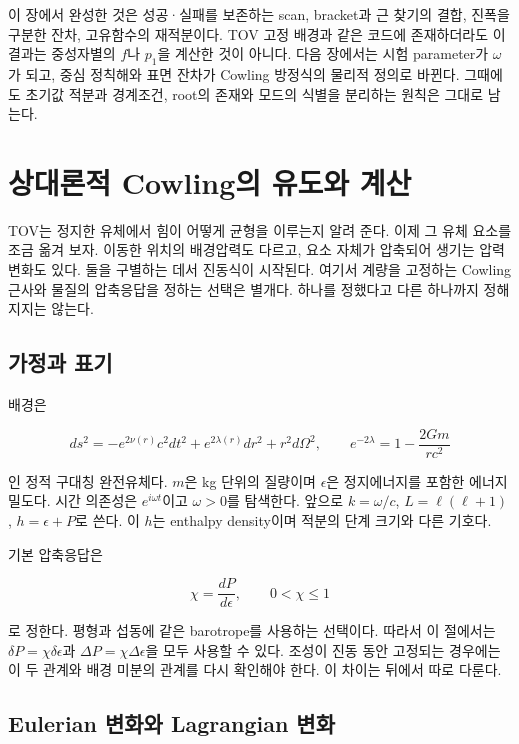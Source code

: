 \documentclass[
  10pt,
  a4paper,
]{article}
\begin{document}
이 장에서 완성한 것은 성공·실패를 보존하는 scan, bracket과 근 찾기의
결합, 진폭을 구분한 잔차, 고유함수의 재적분이다. TOV 고정 배경과 같은
코드에 존재하더라도 이 결과는 중성자별의 \(f\)나 \(p_1\)을 계산한 것이
아니다. 다음 장에서는 시험 parameter가 \(\omega\)가 되고, 중심 정칙해와
표면 잔차가 Cowling 방정식의 물리적 정의로 바뀐다. 그때에도 초기값
적분과 경계조건, root의 존재와 모드의 식별을 분리하는 원칙은 그대로
남는다.


\section{상대론적 Cowling의 유도와
계산}\label{uxc0c1uxb300uxb860uxc801-cowlinguxc758-uxc720uxb3c4uxc640-uxacc4uxc0b0}

TOV는 정지한 유체에서 힘이 어떻게 균형을 이루는지 알려 준다. 이제 그
유체 요소를 조금 옮겨 보자. 이동한 위치의 배경압력도 다르고, 요소 자체가
압축되어 생기는 압력 변화도 있다. 둘을 구별하는 데서 진동식이 시작된다.
여기서 계량을 고정하는 Cowling 근사와 물질의 압축응답을 정하는 선택은
별개다. 하나를 정했다고 다른 하나까지 정해지지는 않는다.

\subsection{가정과 표기}\label{uxac00uxc815uxacfc-uxd45cuxae30}

배경은

\[
ds^2=-e^{2\nu(r)}c^2dt^2+e^{2\lambda(r)}dr^2+r^2d\Omega^2,
\qquad e^{-2\lambda}=1-\frac{2Gm}{rc^2}
\]

인 정적 구대칭 완전유체다. \(m\)은 kg 단위의 질량이며 \(\epsilon\)은
정지에너지를 포함한 에너지밀도다. 시간 의존성은 \(e^{i\omega t}\)이고
\(\omega>0\)를 탐색한다. 앞으로 \(k=\omega/c\), \(L=\ell(\ell+1)\),
\(h=\epsilon+P\)로 쓴다. 이 \(h\)는 enthalpy density이며 적분의 단계
크기와 다른 기호다.

기본 압축응답은

\[
\chi=\frac{dP}{d\epsilon},\qquad 0<\chi\leq1
\]

로 정한다. 평형과 섭동에 같은 barotrope를 사용하는 선택이다. 따라서 이
절에서는 \(\delta P=\chi\delta\epsilon\)과
\(\Delta P=\chi\Delta\epsilon\)을 모두 사용할 수 있다. 조성이 진동 동안
고정되는 경우에는 이 두 관계와 배경 미분의 관계를 다시 확인해야 한다. 이
차이는 뒤에서 따로 다룬다.

\subsection{Eulerian 변화와 Lagrangian
변화}\label{eulerian-uxbcc0uxd654uxc640-lagrangian-uxbcc0uxd654}
\end{document}
